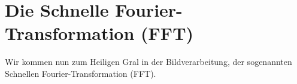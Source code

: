 \section{Die Schnelle Fourier-Transformation (FFT)}

Wir kommen nun zum Heiligen Gral in der Bildverarbeitung, der sogenannten Schnellen 
Fourier-Transformation (FFT).